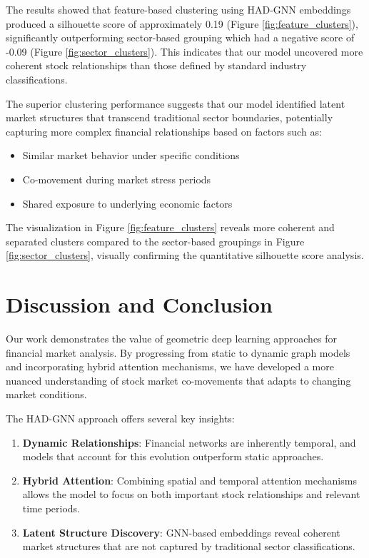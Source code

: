 \documentclass[12pt]{article}
\begin{document}
The results showed that feature-based clustering using HAD-GNN embeddings produced a silhouette score of approximately 0.19 (Figure \ref{fig:feature_clusters}), significantly outperforming sector-based grouping which had a negative score of -0.09 (Figure \ref{fig:sector_clusters}). This indicates that our model uncovered more coherent stock relationships than those defined by standard industry classifications.

The superior clustering performance suggests that our model identified latent market structures that transcend traditional sector boundaries, potentially capturing more complex financial relationships based on factors such as:

\begin{itemize}
    \item Similar market behavior under specific conditions
    \item Co-movement during market stress periods
    \item Shared exposure to underlying economic factors
\end{itemize}

The visualization in Figure \ref{fig:feature_clusters} reveals more coherent and separated clusters compared to the sector-based groupings in Figure \ref{fig:sector_clusters}, visually confirming the quantitative silhouette score analysis.

\section{Discussion and Conclusion}

Our work demonstrates the value of geometric deep learning approaches for financial market analysis. By progressing from static to dynamic graph models and incorporating hybrid attention mechanisms, we have developed a more nuanced understanding of stock market co-movements that adapts to changing market conditions.

The HAD-GNN approach offers several key insights:

\begin{enumerate}
    \item \textbf{Dynamic Relationships}: Financial networks are inherently temporal, and models that account for this evolution outperform static approaches.
    \item \textbf{Hybrid Attention}: Combining spatial and temporal attention mechanisms allows the model to focus on both important stock relationships and relevant time periods.
    \item \textbf{Latent Structure Discovery}: GNN-based embeddings reveal coherent market structures that are not captured by traditional sector classifications.
\end{enumerate}
\end{document}
